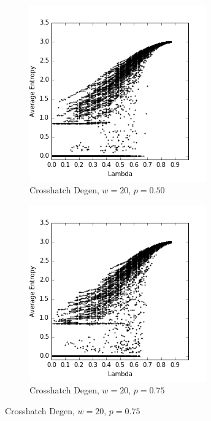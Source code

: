 \documentclass[a4paper,11pt]{report}
\begin{document}
\begin{figure}[htp]
\begin{subfigure}[t]{0.4\textwidth}
\end{subfigure}
~
\begin{subfigure}[t]{0.4\textwidth}
  \centering
  \includegraphics[width=\textwidth]{ch6_figs/ch_w20_p50_entropy_scatter}
  \caption{Crosshatch Degen, $w=20$, $p=0.50$}

\end{subfigure}

\begin{subfigure}[t]{0.4\textwidth}
  \centering
  \includegraphics[width=\textwidth]{ch6_figs/ch_w20_p75_entropy_scatter}
  \caption{Crosshatch Degen, $w=20$, $p=0.75$}


\end{subfigure}
\end{figure}
\end{document}
